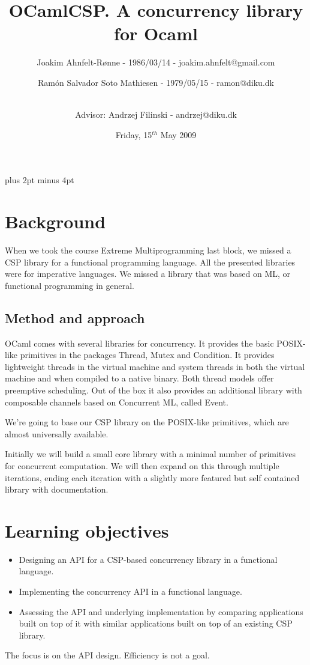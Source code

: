 \documentclass[a4paper,12pt]{article}
\title{OCamlCSP. A concurrency library for Ocaml}
\author{Joakim Ahnfelt-Rønne - 1986/03/14 - joakim.ahnfelt@gmail.com \and 
        Ramón Salvador Soto Mathiesen - 1979/05/15 - ramon@diku.dk \and
        \\ Advisor: Andrzej Filinski - andrzej@diku.dk}
\date{Friday, 15$^{th}$ May 2009}
\begin{document}
\parindent=0pt
\parskip=8pt plus 2pt minus 4pt

\maketitle
\newpage

\section*{Background}
When we took the course Extreme Multiprogramming last block, we missed 
a CSP\cite{hoare} library for a functional programming language. All the 
presented libraries were for imperative languages. We missed a library that 
was based on ML, or functional programming in general.

\subsection*{Method and approach}
OCaml comes with several libraries for concurrency.
It provides the basic POSIX-like primitives in the packages Thread,
Mutex and Condition. It provides lightweight threads in the virtual
machine and system threads in both the virtual machine and when
compiled to a native binary. Both thread models offer preemptive
scheduling. Out of the box it also provides an additional library 
with composable channels based on Concurrent ML, called Event. 

We're going to base our CSP library on the POSIX-like primitives,
which are almost universally available.

Initially we will build a small core library with a minimal number
of primitives for concurrent computation. We will then expand on this
through multiple iterations, ending each iteration with a slightly
more featured but self contained library with documentation.

\section*{Learning objectives} %
\begin{itemize}
 \item Designing an API for a CSP-based concurrency library in a functional
   language.
 \item Implementing the concurrency API in a functional language.
 \item Assessing the API and underlying implementation by comparing
   applications built on top of it with similar applications built on
   top of an existing CSP library.
\end{itemize}
The focus is on the API design. Efficiency is not a goal.
\end{document}
